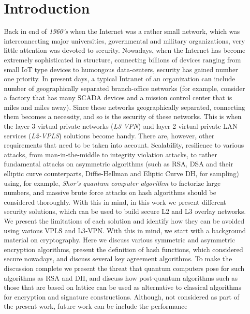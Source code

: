 \chapter{Introduction}

Back in end of {\it 1960’s} when the Internet was a rather small 
network, which was interconnecting major universities, governmental 
and military organizations, very little attention was devoted to 
security. Nowadays, when the Internet has become extremely 
sophisticated in structure, connecting billions of devices ranging 
from small IoT type devices to humongous data-centers, security has 
gained number one priority. In present days, a typical Intranet of 
an organization can include number of geographically separated 
branch-office networks (for example, consider a factory that has 
many SCADA devices and a mission control center that is miles and 
miles away). Since these networks geographically separated, connecting 
them becomes a necessity, and so is the security of these networks. 
This is when the layer-3 virtual private networks ({\it L3-VPN}) and layer-2 
virtual private LAN services ({\it L2-VPLS}) solutions become handy. 
There are, however, other requirements that need to be taken into 
account. Scalability, resilience to various attacks, from man-in-the-middle 
to integrity violation attacks, to rather fundamental attacks on 
asymmetric algorithms (such as RSA, DSA and their elliptic curve 
counterparts, Diffie-Hellman and Eliptic Curve DH, for sampling) 
using, for example, {\it Shor’s quantum computer algorithm} to factorize 
large numbers, and massive brute force attacks on hash algorithms 
should be considered thoroughly. With this in mind, in this work we 
present different security solutions, which can be used to build secure 
L2 and L3 overlay networks. We present the limitations of each solution 
and identify how they can be avoided using various VPLS and L3-VPN.
With this in mind, we start with a background material on cryptography. 
Here we discuss various symmetric and asymmetric encryption algorithms, 
present the definition of hash functions, which considered secure nowadays, 
and discuss several key agreement algorithms. To make the discussion 
complete we present the threat that quantum computers pose for such 
algorithms as RSA and DH, and discuss how post-quantum algorithms such 
as those that are based on lattice can be used as alternative to classical 
algorithms for encryption and signature constructions. Although, not considered 
as part of the present work, future work can be include the performance 
